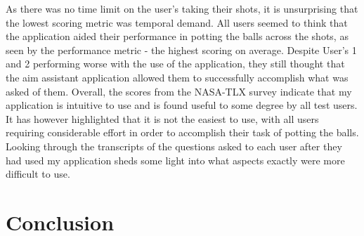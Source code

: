 \documentclass[ %
                author={Finn Alexander Wilkinson},
                supervisor={Dr. Andrew Calway},
                degree={MEng},
                title={\centering A Mixed Reality Aim Assistant for Pool and Snooker},
                subtitle={},
                type={Enterprise},
                year={2021} ]{dissertation}
\begin{document}
As there was no time limit on the user's taking their shots, it is unsurprising that the lowest scoring metric was temporal demand. All users seemed to think that the application aided their performance in potting the balls across the shots, as seen by the performance metric - the highest scoring on average. Despite User's 1 and 2 performing worse with the use of the application, they still thought that the aim assistant application allowed them to successfully accomplish what was asked of them. Overall, the scores from the NASA-TLX survey indicate that my application is intuitive to use and is found useful to some degree by all test users. It has however highlighted that it is not the easiest to use, with all users requiring considerable effort in order to accomplish their task of potting the balls. \\

Looking through the transcripts of the questions asked to each user after they had used my application sheds some light into what aspects exactly were more difficult to use. 




\chapter{Conclusion}
\label{chap:conclusion}



\end{document}
